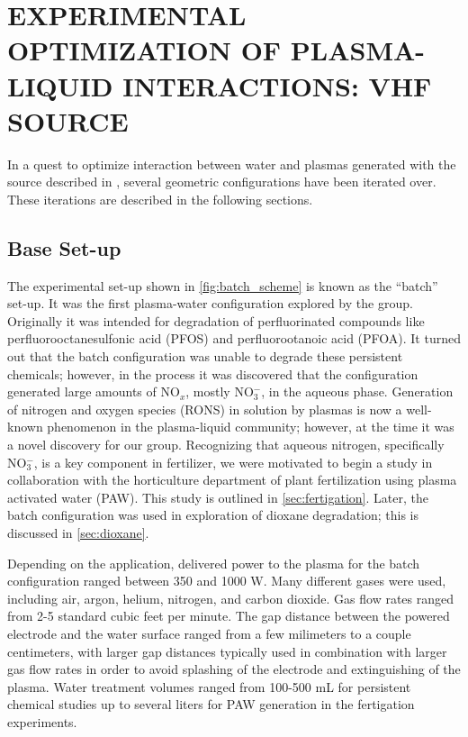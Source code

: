 \chapter{EXPERIMENTAL OPTIMIZATION OF PLASMA-LIQUID INTERACTIONS: VHF SOURCE}
\label{chap:expt_opt}

In a quest to optimize interaction between water and plasmas generated with the source described in \cite{byrns2012vhf}, several geometric configurations have been iterated over. These iterations are described in the following sections.

\section{Base Set-up}

The experimental set-up shown in \cref{fig:batch_scheme} is known as the ``batch'' set-up. It was the first plasma-water configuration explored by the group. Originally it was intended for degradation of perfluorinated compounds like perfluorooctanesulfonic acid (PFOS) and perfluorootanoic acid (PFOA). It turned out that the batch configuration was unable to degrade these persistent chemicals; however, in the process it was discovered that the configuration generated large amounts of NO$_x$, mostly NO$_3^-$, in the aqueous phase. Generation of nitrogen and oxygen species (RONS) in solution by plasmas is now a well-known phenomenon in the plasma-liquid community; however, at the time it was a novel discovery for our group. Recognizing that aqueous nitrogen, specifically NO$_3^-$, is a key component in fertilizer, we were motivated to begin a study in collaboration with the horticulture department of plant fertilization using plasma activated water (PAW). This study is outlined in \cref{sec:fertigation}. Later, the batch configuration was used in exploration of dioxane degradation; this is discussed in \cref{sec:dioxane}.

Depending on the application, delivered power to the plasma for the batch configuration ranged between 350 and 1000 W. Many different gases were used, including air, argon, helium, nitrogen, and carbon dioxide. Gas flow rates ranged from 2-5 standard cubic feet per minute. The gap distance between the powered electrode and the water surface ranged from a few milimeters to a couple centimeters, with larger gap distances typically used in combination with larger gas flow rates in order to avoid splashing of the electrode and extinguishing of the plasma. Water treatment volumes ranged from 100-500 mL for persistent chemical studies up to several liters for PAW generation in the fertigation experiments.

